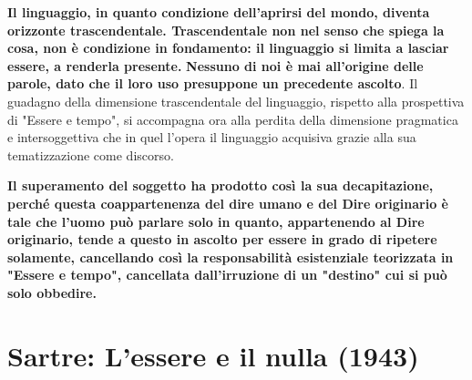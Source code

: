 \textbf{Il linguaggio,
in quanto condizione dell'aprirsi del mondo,
diventa orizzonte trascendentale.
Trascendentale non nel senso che spiega la cosa,
non è condizione in fondamento:
il linguaggio si limita a lasciar essere, a
renderla presente.}
\textbf{Nessuno di noi è mai all'origine delle parole,
dato che il loro uso presuppone un precedente
ascolto}. Il guadagno della dimensione
trascendentale del linguaggio, rispetto alla
prospettiva di "Essere e tempo", si accompagna
ora alla perdita della dimensione pragmatica
e intersoggettiva che in quel l'opera il linguaggio
acquisiva grazie alla sua tematizzazione come
discorso.

\textbf{Il superamento del soggetto ha prodotto così la
sua decapitazione, perché questa coappartenenza
del dire umano e del Dire originario è
tale che l'uomo può parlare solo in quanto,
appartenendo al Dire originario, tende
a questo in ascolto per essere in grado
di ripetere solamente, cancellando così
la responsabilità esistenziale teorizzata in
"Essere e tempo", cancellata dall'irruzione
di un "destino" cui si può solo obbedire.}

\section{Sartre: L'essere e il nulla (1943)}

